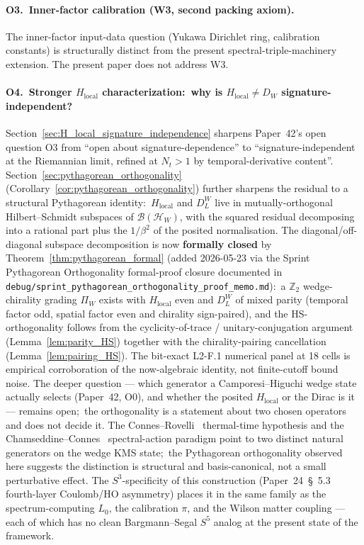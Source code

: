 \documentclass[11pt,a4paper]{article}
\theoremstyle{plain}
\theoremstyle{definition}
\newcommand{\Nt}{N_t}
\newcommand{\Hilb}{\mathcal{H}}
\newcommand{\DL}{D_{L}}
\begin{document}
\paragraph{O3.\ Inner-factor calibration (W3, second packing axiom).}
The inner-factor input-data question (Yukawa Dirichlet ring,
calibration constants) is structurally distinct from the present
spectral-triple-machinery extension. The present paper does not
address W3.

\paragraph{O4.\ Stronger $H_{\mathrm{local}}$ characterization:\ why is
$H_{\mathrm{local}} \ne D_W$ signature-independent?}
Section~\ref{sec:H_local_signature_independence} sharpens Paper~42's
open question O3 from ``open about signature-dependence'' to
``signature-independent at the Riemannian limit, refined at $\Nt > 1$
by temporal-derivative content''.
Section~\ref{sec:pythagorean_orthogonality}
(Corollary~\ref{cor:pythagorean_orthogonality}) further sharpens
the residual to a structural Pythagorean identity:\
$H_{\mathrm{local}}$ and $\DL^W$ live in mutually-orthogonal
Hilbert--Schmidt subspaces of $\mathcal{B}(\Hilb_W)$, with the
squared residual decomposing into a rational part plus the
$1/\beta^{2}$ of the posited normalisation.
The diagonal/off-diagonal subspace decomposition is now
\textbf{formally closed} by Theorem~\ref{thm:pythagorean_formal}
(added 2026-05-23 via the Sprint Pythagorean Orthogonality
formal-proof closure documented in
\texttt{debug/sprint\_pythagorean\_orthogonality\_proof\_memo.md}):\
a $\mathbb{Z}_{2}$ wedge-chirality grading $\Pi_{W}$ exists with
$H_{\mathrm{local}}$ even and $\DL^{W}$ of mixed parity (temporal factor
odd, spatial factor even and chirality sign-paired), and the
HS-orthogonality follows from the cyclicity-of-trace /
unitary-conjugation argument (Lemma~\ref{lem:parity_HS}) together with
the chirality-pairing cancellation (Lemma~\ref{lem:pairing_HS}). The bit-exact L2-F.1 numerical
panel at 18 cells is empirical corroboration of the now-algebraic
identity, not finite-cutoff bound noise.
The deeper question --- which generator a Camporesi--Higuchi wedge
state actually selects (Paper~42, O0), and whether the posited
$H_{\mathrm{local}}$ or the Dirac is it --- remains open;\ the
orthogonality is a statement about two chosen operators and does not
decide it. The Connes--Rovelli~\cite{connes_rovelli1994} thermal-time
hypothesis and the Chamseddine--Connes~\cite{chamseddine_connes2010}
spectral-action paradigm point to two distinct natural generators on
the wedge KMS state;\ the Pythagorean orthogonality observed here
suggests the distinction is structural and basis-canonical, not a
small perturbative effect. The $S^3$-specificity of this
construction (Paper~24~\S~5.3~\cite{paper24} fourth-layer
Coulomb/HO asymmetry) places it in the same family as the
spectrum-computing $L_0$, the calibration $\pi$, and the Wilson
matter coupling --- each of which has no clean Bargmann--Segal
$S^5$ analog at the present state of the framework.
\end{document}
